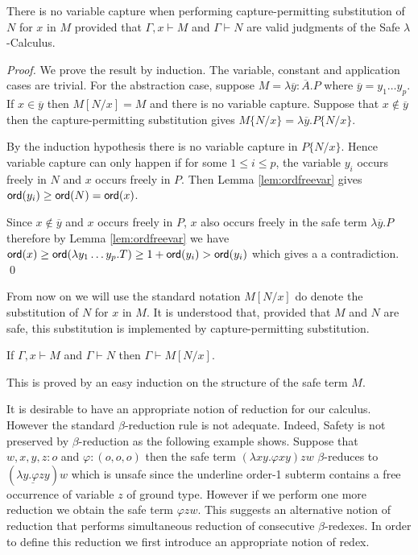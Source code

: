 \documentclass{llncs}
\newcommand\subst[2]{\left[ #1/#2 \right]}
\newcommand\captsubst[2]{\{#1/#2 \}}
\newcommand\ord[1]{{\sf ord}(#1)}
\begin{document}
\begin{lemma}
\label{lem:homog_nocapture} There is
no variable capture when performing capture-permitting
substitution of $N$ for $x$ in $M$
provided that $\Gamma, x \vdash M$ and $\Gamma \vdash  N$ are valid judgments of the Safe $\lambda$-Calculus.
\end{lemma}

\begin{proof}
We prove the result by induction. The variable, constant and
application cases are trivial. For the abstraction case, suppose $M
= \lambda \overline{y} : \overline{A}. P$ where $\overline{y} = y_1
\ldots y_p$. If $x \in \overline{y}$ then $M \subst{N}{x} = M$ and there is no variable capture.
Suppose that $x \not\in \overline{y}$ then the capture-permitting substitution gives
$M \captsubst{N}{x} = \lambda \overline{y} . P \captsubst{N}{x}$.

By the induction hypothesis there is no variable capture in $P \captsubst{N}{x}$.
Hence variable capture can only happen if for some $1 \leq i \leq p$, the variable $y_i$
occurs freely in $N$ and $x$ occurs freely in $P$. Then Lemma \ref{lem:ordfreevar} gives
$ \ord{y_i} \geq \ord{N} = \ord{x}$.

Since $x \not \in \overline{y}$ and $x$ occurs freely in $P$, $x$ also occurs freely in the safe term
$\lambda \overline{y}. P$ therefore by Lemma \ref{lem:ordfreevar} we have
$ \ord{x} \geq \ord{\lambda y_1 \ldots y_p . T} \geq 1+ \ord{y_i} > \ord{y_i}$
which gives a a contradiction. \qed
\end{proof}

From now on we will use the standard notation $M\subst{N}{x}$ do denote the substitution of $N$ for $x$ in $M$.
It is understood that, provided that $M$ and $N$ are safe, this substitution
is implemented by capture-permitting substitution.


\begin{lemma}
\label{lem:subst_preserve_safety}
If $\Gamma, x \vdash M$ and $\Gamma \vdash N$ then $\Gamma \vdash M[N/x]$.
\end{lemma}
This is proved by an easy induction on the structure of the safe term $M$.


It is desirable to have an appropriate notion of reduction for our calculus. However the standard $\beta$-reduction rule is not adequate. Indeed, Safety is not preserved by $\beta$-reduction as the following example shows. Suppose that $w,x,y,z : o$ and $\varphi : (o,o,o)$ then the safe term $(\lambda x y . \varphi x y) z w$ $\beta$-reduces to $(\underline{\lambda y . \varphi z y}) w$ which is unsafe since the underline order-1 subterm  contains a free occurrence of variable $z$ of ground type. However if we perform one more reduction we obtain the safe term
$\varphi z w$. This suggests an alternative notion of reduction that performs simultaneous reduction of consecutive $\beta$-redexes. In order to define this reduction we first introduce an appropriate notion of redex.
\end{document}
